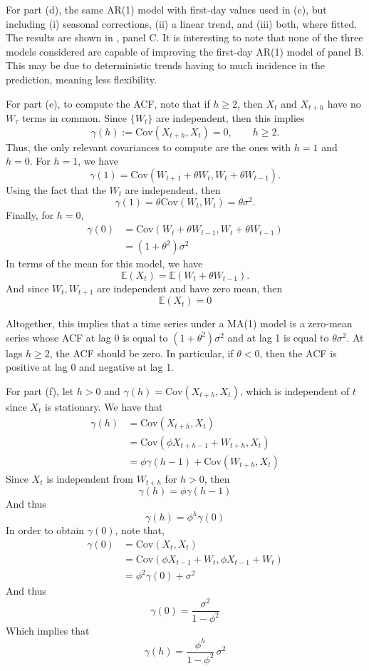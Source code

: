 \documentclass[11pt, english]{article}
\begin{document}
\begin{multicols}{2}
For part (d), the same AR(1) model with first-day values used in (c), but including (i) seasonal corrections, (ii) a linear trend, and (iii) both, where fitted. The results are shown in , panel C. It is interesting to note that none of the three models considered are capable of improving the first-day AR(1) model of panel B. This may be due to deterministic trends having to much incidence in the prediction, meaning less flexibility.

For part (e), to compute the ACF, note that if $h \geq 2$, then $X_{t}$ and $X_{t+h}$ have no $W_{\tau}$ terms in common. Since $\{W_{t}\}$ are independent, then this implies
	$$\gamma(h) := \mathrm{Cov}(X_{t+h}, X_{t}) = 0,\qquad h \geq 2.$$
Thus, the only relevant covariances to compute are the ones with $h=1$ and $h=0$. For $h=1$, we have
	$$\gamma(1) = \mathrm{Cov}(W_{t+1} + \theta W_{t}, W_{t} + \theta W_{t-1}).$$
Using the fact that the $W_{t}$ are independent, then
	$$\gamma(1) = \theta \mathrm{Cov}(W_{t}, W_{t}) = \theta\sigma^{2}.$$
Finally, for $h =0$,
	\begin{align*}
		\gamma(0)	&=	\mathrm{Cov}(W_{t} + \theta W_{t-1}, W_{t} + \theta W_{t-1})	\\
					&=	(1+\theta^{2})\sigma^{2}
	\end{align*}
In terms of the mean for this model, we have
	$$\mathbb{E}(X_{t}) = \mathbb{E}(W_{t} + \theta W_{t-1}).$$
And since $W_{t}, W_{t+1}$ are independent and have zero mean, then
	$$\mathbb{E}(X_{t}) = 0$$

Altogether, this implies that a time series under a MA(1) model is a zero-mean series whose ACF at lag 0 is equal to $(1+\theta^{2})\sigma^{2}$ and at lag 1 is equal to $\theta \sigma^{2}$. At lags $h \geq 2$, the ACF should be zero. In particular, if $\theta < 0$, then the ACF is positive at lag 0 and negative at lag 1.

For part (f), let $h > 0$ and $\gamma(h) = \mathrm{Cov}(X_{t+h}, X_{t})$, which is independent of $t$ since $X_{t}$ is stationary. We have that
	\begin{align*}
		\gamma(h)
			&=	\mathrm{Cov}(X_{t+h}, X_{t})	\\
			&=	\mathrm{Cov}(\phi X_{t+h-1} + W_{t+h}, X_{t})	\\
			&=	\phi \gamma(h-1) + \mathrm{Cov}(W_{t+h}, X_{t})
	\end{align*}
Since $X_{t}$ is independent from $W_{t+h}$ for $h > 0$, then
	$$\gamma(h) = \phi \gamma(h-1)$$
And thus
	$$\gamma(h) = \phi^{h}\gamma(0)$$
In order to obtain $\gamma(0)$, note that,
	\begin{align*}
		\gamma(0)	&=	\mathrm{Cov}(X_{t}, X_{t})	\\
					&=	\mathrm{Cov}(\phi X_{t-1} + W_{t}, \phi X_{t-1} + W_{t})	\\
					&=	\phi^{2} \gamma(0) + \sigma^{2}
	\end{align*}	
And thus
	$$\gamma(0) = \frac{\sigma^{2}}{1-\phi^{2}}$$
Which implies that
	$$\gamma(h) = \frac{\phi^{h}}{1-\phi^{2}}\, \sigma^{2}$$


\end{multicols}
\end{document}
